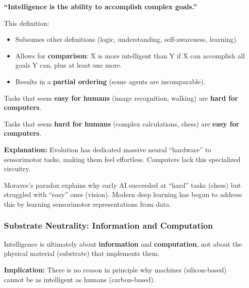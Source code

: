 \begin{defbox}
\textbf{``Intelligence is the ability to accomplish complex goals.''}

This definition:
\begin{itemize}
  \item Subsumes other definitions (logic, understanding, self-awareness, learning).
  \item Allows for \textbf{comparison}: X is more intelligent than Y if X can accomplish all goals Y can, plus at least one more.
  \item Results in a \textbf{partial ordering} (some agents are incomparable).
\end{itemize}
\end{defbox}

\begin{defbox}
Tasks that seem \textbf{easy for humans} (image recognition, walking) are \textbf{hard for computers}.

Tasks that seem \textbf{hard for humans} (complex calculations, chess) are \textbf{easy for computers}.

\textbf{Explanation:} Evolution has dedicated massive neural ``hardware'' to sensorimotor tasks, making them feel effortless. Computers lack this specialized circuitry.
\end{defbox}

\begin{tipbox}
Moravec's paradox explains why early AI succeeded at ``hard'' tasks (chess) but struggled with ``easy'' ones (vision). Modern deep learning has begun to address this by learning sensorimotor representations from data.
\end{tipbox}

\bigseparator

\subsubsection{Substrate Neutrality: Information and Computation}

\begin{thmbox}
Intelligence is ultimately about \textbf{information} and \textbf{computation}, not about the physical material (substrate) that implements them.

\textbf{Implication:} There is no reason in principle why machines (silicon-based) cannot be as intelligent as humans (carbon-based).
\end{thmbox}

